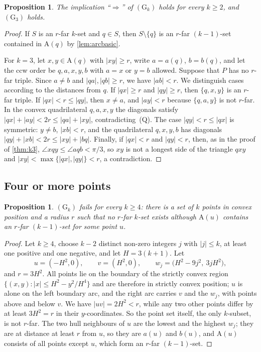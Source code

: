 \documentclass[11pt,a4paper]{article}
\newtheorem{proposition}[theorem]{Proposition}
\theoremstyle{definition}
\theoremstyle{remark}
\newcommand{\ang}{\angle}
\newcommand{\Arc}{\mathrm{A}}
\begin{document}
\begin{proposition}\label{prop:g3}
The implication ``$\Rightarrow$'' of $(\mathrm{G}_k)$ holds for every
$k\ge2$, and $(\mathrm{G}_3)$ holds.
\end{proposition}
\begin{proof}
If $S$ is an $r$-far $k$-set and $q\in S$, then $S\setminus\{q\}$ is an
$r$-far $(k-1)$-set contained in $\Arc(q)$ by \cref{lem:arcbasic}.

For $k=3$, let $x,y\in\Arc(q)$ with $|xy|\ge r$, write $a=a(q)$, $b=b(q)$,
and let the ccw order be $q,a,x,y,b$ with $a=x$ or $y=b$ allowed. Suppose that
$P$ has no $r$-far triple. Since $a\ne b$ and $|qa|,|qb|\ge r$, we have
$|ab|<r$. We distinguish cases according to the distances from $q$.
If $|qx|\ge r$ and $|qy|\ge r$, then $\{q,x,y\}$ is an $r$-far triple.
If $|qx|<r\le|qy|$, then $x\ne a$, and $|ay|<r$ because $\{q,a,y\}$ is not
$r$-far. In the convex quadrilateral $q,a,x,y$ the diagonals satisfy
$|qx|+|ay|<2r\le|qa|+|xy|$, contradicting~(Q). The case $|qy|<r\le|qx|$ is
symmetric: $y\neq b$, $|xb|<r$, and the quadrilateral $q,x,y,b$ has diagonals
$|qy|+|xb|<2r\le|xy|+|bq|$. Finally, if $|qx|<r$ and $|qy|<r$, then, as in the
proof of \cref{thm:k3}, $\ang xqy\le\ang aqb<\pi/3$, so $xy$ is not a longest
side of the triangle $qxy$ and $|xy|<\max\{|qx|,|qy|\}<r$, a contradiction.
\end{proof}

\subsection{Four or more points}\label{sec:k4}

\begin{proposition}\label{prop:gk}
$(\mathrm{G}_k)$ fails for every $k\ge4$: there is a set of $k$ points in
convex position and a radius $r$ such that no $r$-far $k$-set exists although
$\Arc(u)$ contains an $r$-far $(k-1)$-set for some point $u$.
\end{proposition}
\begin{proof}
Let $k\ge4$, choose $k-2$ distinct non-zero integers $j$ with $|j|\le k$, at
least one positive and one negative, and let $H=3(k+1)$. Let
\[
u=(-H^2,0),\qquad v=(H^2,0),\qquad w_j=\bigl(H^2-9j^2,\ 3jH^2\bigr),
\]
and $r=3H^2$. All points lie on the boundary of the strictly convex region
$\{(x,y):|x|\le H^2-y^2/H^4\}$ and are therefore in strictly convex position;
$u$ is alone on the left boundary arc, and the right arc carries $v$ and the
$w_j$, with points above and below $v$. We have $|uv|=2H^2<r$, while any two
other points differ by at least $3H^2=r$ in their $y$-coordinates. So the
point set itself, the only $k$-subset, is not $r$-far. The two hull neighbours
of $u$ are the lowest and the highest $w_j$; they are at distance at least
$r$ from $u$, so they are $a(u)$ and $b(u)$, and $\Arc(u)$ consists of all
points except $u$, which form an $r$-far $(k-1)$-set.
\end{proof}
\end{document}
